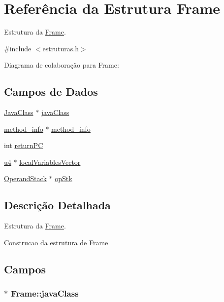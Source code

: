 \hypertarget{struct_frame}{}\section{Referência da Estrutura Frame}
\label{struct_frame}


Estrutura da \hyperlink{struct_frame}{Frame}.  




{\ttfamily \#include $<$estruturas.\+h$>$}



Diagrama de colaboração para Frame\+:
\subsection*{Campos de Dados}
\begin{DoxyCompactItemize}
\item 
\hyperlink{struct_java_class}{Java\+Class} $\ast$ \hyperlink{struct_frame_ac06cb2c272949f9290bca323136f6438}{java\+Class}
\item 
\hyperlink{estruturas_8h_a02c1a928a94e9fab2c72044003c7bce6}{method\+\_\+info} $\ast$ \hyperlink{struct_frame_a4dbf8107ea01f748582bb060aa299628}{method\+\_\+info}
\item 
int \hyperlink{struct_frame_a0f431de4c352b8c9a170a8e74d7c3a15}{return\+PC}
\item 
\hyperlink{estruturas_8h_aedf6ddc03df8caaaccbb4c60b9a9b850}{u4} $\ast$ \hyperlink{struct_frame_a17cc84db651051b7d067f14eebe7c8b6}{local\+Variables\+Vector}
\item 
\hyperlink{struct_operand_stack}{Operand\+Stack} $\ast$ \hyperlink{struct_frame_a0cd2446df36707c236ffaf43844d387a}{op\+Stk}
\end{DoxyCompactItemize}


\subsection{Descrição Detalhada}
Estrutura da \hyperlink{struct_frame}{Frame}. 

Construcao da estrutura de \hyperlink{struct_frame}{Frame} 

\subsection{Campos}
\subsubsection[{\texorpdfstring{java\+Class}{javaClass}}]{$\ast$ Frame\+::java\+Class}\hypertarget{struct_frame_ac06cb2c272949f9290bca323136f6438}{}\label{struct_frame_ac06cb2c272949f9290bca323136f6438}
